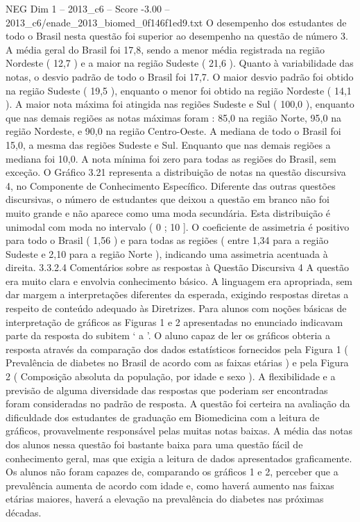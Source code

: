 \begin{textsample}{NEG Dim 1 – 2013\_c6 – Score -3.00 – 2013\_c6/enade\_2013\_biomed\_0f146f1ed9.txt}
O desempenho dos estudantes de todo o Brasil nesta questão foi superior ao desempenho na questão de número 3.
A média geral do Brasil foi 17,8, sendo a menor média registrada na região Nordeste ( 12,7 ) e a maior na região Sudeste ( 21,6 ).
Quanto à variabilidade das notas, o desvio padrão de todo o Brasil foi 17,7.
O maior desvio padrão foi obtido na região Sudeste ( 19,5 ), enquanto o menor foi obtido na região Nordeste ( 14,1 ).
A maior nota máxima foi atingida nas regiões Sudeste e Sul ( 100,0 ), enquanto que nas demais regiões as notas máximas foram : 85,0 na região Norte, 95,0 na região Nordeste, e 90,0 na região Centro-Oeste.
A mediana de todo o Brasil foi 15,0, a mesma das regiões Sudeste e Sul.
Enquanto que nas demais regiões a mediana foi 10,0.
A nota mínima foi zero para todas as regiões do Brasil, sem exceção.
O Gráfico 3.21 representa a distribuição de notas na questão discursiva 4, no Componente de Conhecimento Específico.
Diferente das outras questões discursivas, o número de estudantes que deixou a questão em branco não foi muito grande e não aparece como uma moda secundária.
Esta distribuição é unimodal com moda no intervalo ( 0 ; 10 ].
O coeficiente de assimetria é positivo para todo o Brasil ( 1,56 ) e para todas as regiões ( entre 1,34 para a região Sudeste e 2,10 para a região Norte ), indicando uma assimetria acentuada à direita. 3.3.2.4 Comentários sobre as respostas à Questão Discursiva 4 A questão era muito clara e envolvia conhecimento básico.
A linguagem era apropriada, sem dar margem a interpretações diferentes da esperada, exigindo respostas diretas a respeito de conteúdo adequado às Diretrizes.
Para alunos com noções básicas de interpretação de gráficos as Figuras 1 e 2 apresentadas no enunciado indicavam parte da resposta do subitem ‘ a ’.
O aluno capaz de ler os gráficos obteria a resposta através da comparação dos dados estatísticos fornecidos pela Figura 1 ( Prevalência de diabetes no Brasil de acordo com as faixas etárias ) e pela Figura 2 ( Composição absoluta da população, por idade e sexo ).
A flexibilidade e a previsão de alguma diversidade das respostas que poderiam ser encontradas foram consideradas no padrão de resposta.
A questão foi certeira na avaliação da dificuldade dos estudantes de graduação em Biomedicina com a leitura de gráficos, provavelmente responsável pelas muitas notas baixas.
A média das notas dos alunos nessa questão foi bastante baixa para uma questão fácil de conhecimento geral, mas que exigia a leitura de dados apresentados graficamente.
Os alunos não foram capazes de, comparando os gráficos 1 e 2, perceber que a prevalência aumenta de acordo com idade e, como haverá aumento nas faixas etárias maiores, haverá a elevação na prevalência do diabetes nas próximas décadas.

\end{textsample}

